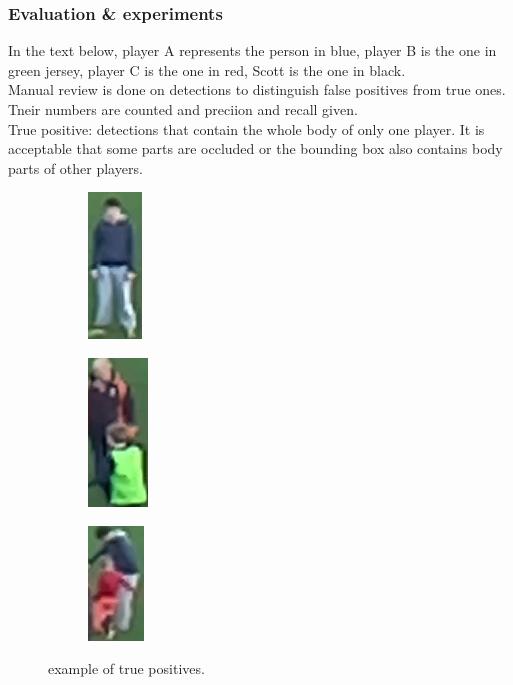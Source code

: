 \documentclass{article}
\begin{document}
\subsubsection{Evaluation \& experiments}
In the text below, player A represents the person in blue, player B is the one in green jersey, player C is the one in red, Scott is the one in black.\\
Manual review is done on detections to distinguish false positives from true ones. Tneir numbers are counted and preciion and recall given.\\
True positive: detections that contain the whole body of only one player. It is acceptable that some parts are occluded or the bounding box also contains body parts of other players.\\
\begin{figure}[h!]
\centering
  \begin{subfigure}[b]{0.15\linewidth}
  \centering
    \includegraphics[scale=0.4]{report/pic/4/pos_1.jpg} 
    \caption{}
  \end{subfigure}
  \begin{subfigure}[b]{0.15\linewidth}
  \centering
    \includegraphics[scale=0.4]{report/pic/4/pos_2.jpg} 
    \caption{}
  \end{subfigure}
  \begin{subfigure}[b]{0.15\linewidth}
  \centering
    \includegraphics[scale=0.4]{report/pic/4/pos_3.jpg}
    \caption{} 
  \end{subfigure}
  \caption{example of true positives.}
\end{figure}
\end{document}
